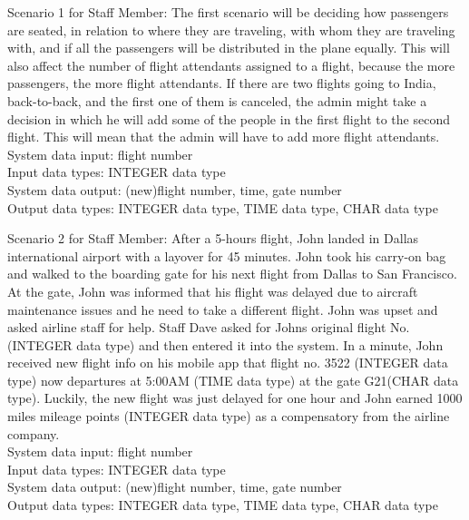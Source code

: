 \documentclass[10pt,conference]{IEEEtran}
\begin{document}
\vspace{5mm}
Scenario 1 for Staff Member:
The first scenario will be deciding how passengers are seated, in relation to where they are traveling, with whom they are traveling with, and if all the passengers will be distributed in the plane equally. This will also affect the number of flight attendants assigned to a flight, because the more passengers, the more flight attendants.
	If there are two flights going to India, back-to-back, and the first one of them is canceled, the admin might take a decision in which he will add some of the people in the first flight to the second flight. This will mean that the admin will have to add more flight attendants.
 \vspace{5mm}\\System data input: flight number
\\
Input data types: INTEGER data type\\
System data output: (new)flight number, time, gate number\\
Output data types: INTEGER data type, TIME data type, CHAR data type



\vspace{5mm}
Scenario 2 for Staff Member:
After a 5-hours flight, John landed in Dallas international airport with a layover for 45 minutes. John took his carry-on bag and walked to the boarding gate for his next flight from Dallas to San Francisco. At the gate, John was informed that his flight was delayed due to aircraft maintenance issues and he need to take a different flight. John was upset and asked airline staff for help. Staff Dave asked for Johns original flight No. (INTEGER data type) and then entered it into the system. In a minute, John received new flight info on his mobile app that flight no. 3522 (INTEGER data type) now departures at 5:00AM (TIME data type) at the gate G21(CHAR data type). Luckily, the new flight was just delayed for one hour and John earned 1000 miles mileage points (INTEGER data type) as a compensatory from the airline company. \vspace{5mm}\\System data input: flight number
\\
Input data types: INTEGER data type\\
System data output: (new)flight number, time, gate number\\
Output data types: INTEGER data type, TIME data type, CHAR data type
\end{document}
